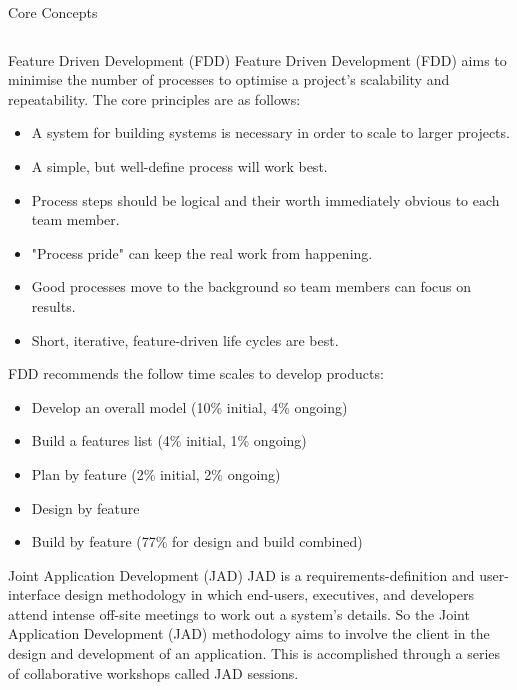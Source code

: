 \documentclass[final,hyperref={pdfpagelabels=false}]{beamer}
\begin{document}
  \begin{frame}{Core Concepts}
    \begin{columns}[t]
      \begin{column}{.48\linewidth}
        \begin{block}{Feature Driven Development (FDD)}
            Feature Driven Development (FDD) aims to minimise the number of processes to optimise a project's scalability and repeatability. The core principles are as follows: 
            \begin{itemize}
                \item A system for building systems is necessary in order to scale to larger projects.
                \item A simple, but well-define process will work best.
                \item Process steps should be logical and their worth immediately obvious to each team member.
                \item "Process pride" can keep the real work from happening.
                \item Good processes move to the background so team members can focus on results.
                \item Short, iterative, feature-driven life cycles are best.
            \end{itemize}
            FDD recommends the follow time scales to develop products:  
            \begin{itemize}
                \item Develop an overall model (10\% initial, 4\%  ongoing)
                \item Build a features list (4\%  initial, 1\%  ongoing)
                \item Plan by feature (2\%  initial, 2\%  ongoing)
                \item Design by feature
                \item Build by feature (77\% for design and build combined)
            \end{itemize}
        \end{block}
        \begin{block}{Joint Application Development (JAD)}
            JAD is a requirements-definition and user-interface design methodology in which end-users, executives, and developers attend intense off-site meetings to work out a system's details. So the Joint Application Development (JAD) methodology aims to involve the client in the design and development of an application. This is accomplished through a series of collaborative workshops called JAD sessions.
     

\end{block}
\end{column}
\end{columns}
\end{frame}
\end{document}
